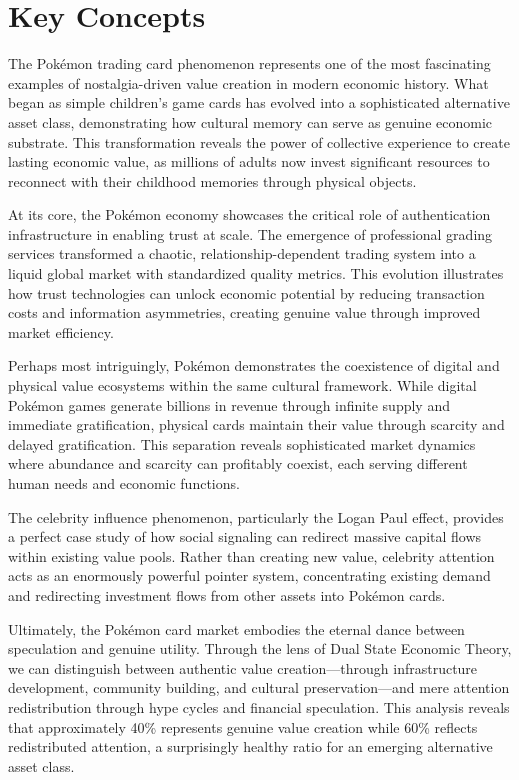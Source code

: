 \documentclass[11pt,oneside]{book}
\begin{document}
{{{{{{\section{Key Concepts}

The Pokémon trading card phenomenon represents one of the most fascinating examples of nostalgia-driven value creation in modern economic history. What began as simple children's game cards has evolved into a sophisticated alternative asset class, demonstrating how cultural memory can serve as genuine economic substrate. This transformation reveals the power of collective experience to create lasting economic value, as millions of adults now invest significant resources to reconnect with their childhood memories through physical objects.

At its core, the Pokémon economy showcases the critical role of authentication infrastructure in enabling trust at scale. The emergence of professional grading services transformed a chaotic, relationship-dependent trading system into a liquid global market with standardized quality metrics. This evolution illustrates how trust technologies can unlock economic potential by reducing transaction costs and information asymmetries, creating genuine value through improved market efficiency.

Perhaps most intriguingly, Pokémon demonstrates the coexistence of digital and physical value ecosystems within the same cultural framework. While digital Pokémon games generate billions in revenue through infinite supply and immediate gratification, physical cards maintain their value through scarcity and delayed gratification. This separation reveals sophisticated market dynamics where abundance and scarcity can profitably coexist, each serving different human needs and economic functions.

The celebrity influence phenomenon, particularly the Logan Paul effect, provides a perfect case study of how social signaling can redirect massive capital flows within existing value pools. Rather than creating new value, celebrity attention acts as an enormously powerful pointer system, concentrating existing demand and redirecting investment flows from other assets into Pokémon cards.

Ultimately, the Pokémon card market embodies the eternal dance between speculation and genuine utility. Through the lens of Dual State Economic Theory, we can distinguish between authentic value creation—through infrastructure development, community building, and cultural preservation—and mere attention redistribution through hype cycles and financial speculation. This analysis reveals that approximately 40\% represents genuine value creation while 60\% reflects redistributed attention, a surprisingly healthy ratio for an emerging alternative asset class.

}}}}}}
\end{document}
